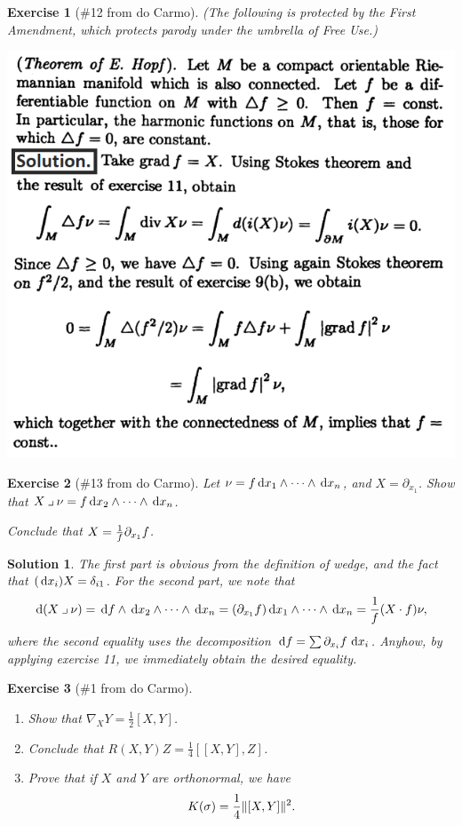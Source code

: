 \documentclass{article}
\theoremstyle{plain}
\newtheorem*{ex}{Exercise}
\theoremstyle{nonumberplain}
\newtheorem{sol}{Solution}
\newcommand{\into}{\mathbin{\lrcorner}}
\let\div\relax
\DeclareMathOperator{\div}{div}
\DeclarePairedDelimiter{\Norm}{\lVert}{\rVert}
\begin{document}
\begin{ex}[\#12 from do Carmo]
(The following is protected by the First Amendment, which protects parody under the umbrella of Free Use.)
\end{ex}
\includegraphics[width=\linewidth]{hint}

\begin{ex}[\#13 from do Carmo]
Let $\nu = f \dl x_1 \wedge \dots \wedge \dl x_n$, and $X = \partial_{x_1}$. Show that $X \into \nu = f \dl x_2 \wedge \dots \wedge \dl x_n$.

Conclude that $\div X = \frac1f \partial_{x_1} f$.
\end{ex}

\begin{sol}
The first part is obvious from the definition of wedge, and the fact that $(\dl x_i) X = \delta_{i1}$. For the second part, we note that
\begin{equation}
\dl(X \into \nu) = \dl f \wedge \dl x_2 \wedge \dots \wedge \dl x_n = (\partial_{x_1} f) \dl x_1 \wedge \dots \wedge \dl x_n = \frac1f (X \cdot f) \nu,
\end{equation}
where the second equality uses the decomposition $\dl f = \sum \partial_{x_i} f \, \dl x_i$. Anyhow, by applying exercise 11, we immediately obtain the desired equality.
\end{sol}

\begin{ex}[\#1 from do Carmo]
\leavevmode
\begin{enumerate}
\item Show that $\nabla_X Y = \frac12 [X,Y]$.
\item Conclude that $R(X,Y) Z = \frac14 [[X,Y],Z]$.
\item Prove that if $X$ and $Y$ are orthonormal, we have
\begin{equation}
K(\sigma) = \frac14 \Norm{[X,Y]}^2.
\end{equation}
\end{enumerate}
\end{ex}
\end{document}
